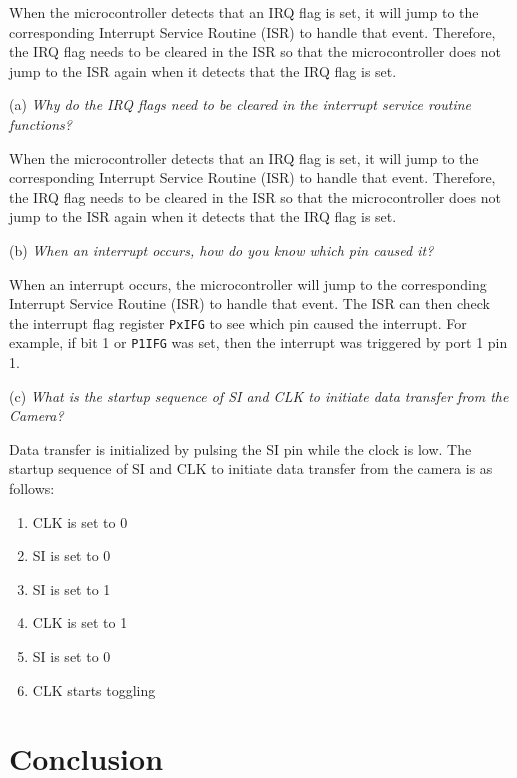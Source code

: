 \documentclass[CMPE]{KGCOEReport}
\begin{document}
When the microcontroller detects that an IRQ flag is set, it will jump to the corresponding Interrupt Service Routine (ISR) to handle that event. Therefore, the IRQ flag needs to be cleared in the ISR so that the microcontroller does not jump to the ISR again when it detects that the IRQ flag is set.\\
\bigskip

(a) \emph{Why do the IRQ flags need to be cleared in the interrupt service routine functions?}

When the microcontroller detects that an IRQ flag is set, it will jump to the corresponding Interrupt Service Routine (ISR) to handle that event. Therefore, the IRQ flag needs to be cleared in the ISR so that the microcontroller does not jump to the ISR again when it detects that the IRQ flag is set.
\bigskip

(b) \emph{When an interrupt occurs, how do you know which pin caused it?}

When an interrupt occurs, the microcontroller will jump to the corresponding Interrupt Service Routine (ISR) to handle that event. The ISR can then check the interrupt flag register \verb|PxIFG| to see which pin caused the interrupt. For example, if bit 1 or \verb|P1IFG| was set, then the interrupt was triggered by port 1 pin 1.
\bigskip

(c) \emph{What is the startup sequence of SI and CLK to initiate data transfer from the Camera?}


Data transfer is initialized by pulsing the SI pin while the clock is low. The startup sequence of SI and CLK to initiate data transfer from the camera is as follows:

\begin{enumerate}
    \item CLK is set to 0
    \item SI is set to 0
    \item SI is set to 1
    \item CLK is set to 1
    \item SI is set to 0
    \item CLK starts toggling
\end{enumerate}

\section*{Conclusion}
\end{document}
